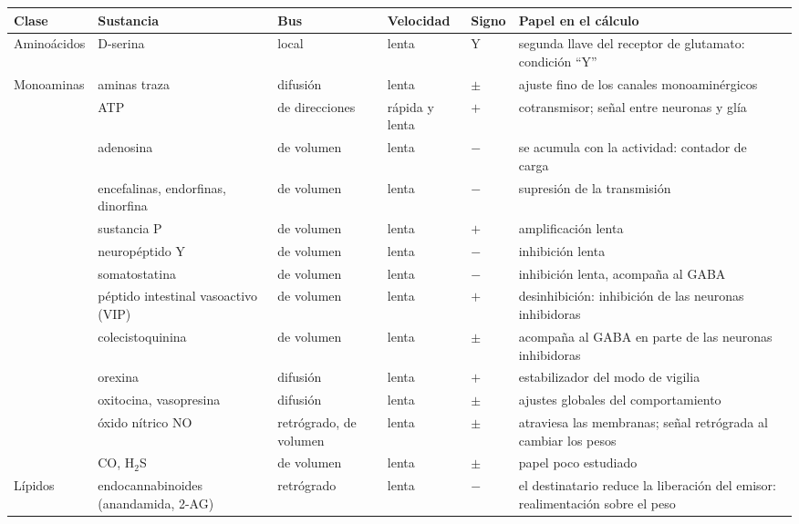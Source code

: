 \begin{table}[t]
\centering
\footnotesize
\setlength{\tabcolsep}{4pt}
\renewcommand{\arraystretch}{1.12}
\begin{tabular}{>{\raggedright}p{2.25cm}>{\raggedright}p{2.8cm}>{\raggedright}p{1.8cm}>{\raggedright}p{1.5cm}>{\centering}p{0.8cm}>{\raggedright\arraybackslash}p{4.3cm}}
\toprule
Clase & Sustancia & Bus & Velocidad & Signo & Papel en el cálculo \\
\midrule
Aminoácidos & D-serina & local & lenta & Y & segunda llave del receptor de glutamato: condición “Y” \\
\midrule
Monoaminas & aminas traza & difusión & lenta & $\pm$ & ajuste fino de los canales monoaminérgicos \\
\midrule
\multirow{2}{2.25cm}{Purinas}
 & ATP & de direcciones & rápida y lenta & $+$ & cotransmisor; señal entre neuronas y glía \\
 & adenosina & de volumen & lenta & $-$ & se acumula con la actividad: contador de carga~\cite{Dunwiddie2001} \\
\midrule
\multirow{8}{2.25cm}{Neuropéptidos (más de cien)}
 & encefalinas, endorfinas, dinorfina & de volumen & lenta & $-$ & supresión de la transmisión \\
 & sustancia P & de volumen & lenta & $+$ & amplificación lenta \\
 & neuropéptido Y & de volumen & lenta & $-$ & inhibición lenta \\
 & somatostatina & de volumen & lenta & $-$ & inhibición lenta, acompaña al GABA \\
 & péptido intestinal vasoactivo (VIP) & de volumen & lenta & $+$ & desinhibición: inhibición de las neuronas inhibidoras \\
 & colecistoquinina & de volumen & lenta & $\pm$ & acompaña al GABA en parte de las neuronas inhibidoras \\
 & orexina & difusión & lenta & $+$ & estabilizador del modo de vigilia \\
 & oxitocina, vasopresina & difusión & lenta & $\pm$ & ajustes globales del comportamiento \\
\midrule
\multirow{2}{2.25cm}{Gases}
 & óxido nítrico NO & retrógrado, de volumen & lenta & $\pm$ & atraviesa las membranas; señal retrógrada al cambiar los pesos~\cite{Garthwaite2008} \\
 & CO, H$_2$S & de volumen & lenta & $\pm$ & papel poco estudiado \\
\midrule
Lípidos & endocannabinoides (anandamida, 2-AG) & retrógrado & lenta & $-$ & el destinatario reduce la liberación del emisor: realimentación sobre el peso~\cite{WilsonNicoll2001} \\

\end{tabular}
\end{table}
